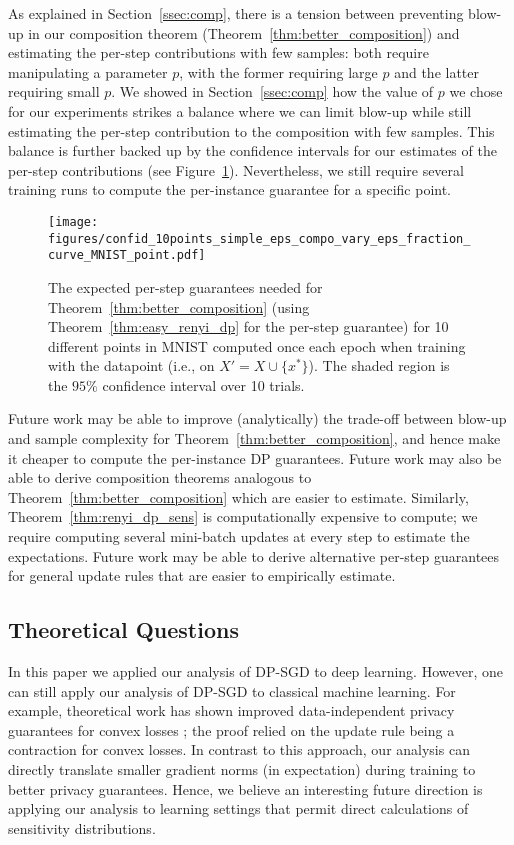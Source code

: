 As explained in Section~\ref{ssec:comp}, there is a tension between preventing blow-up in our composition theorem (Theorem~\ref{thm:better_composition}) and estimating the per-step contributions with few samples: both require manipulating a parameter $p$, with the former requiring large $p$ and the latter requiring small $p$. We showed in Section~\ref{ssec:comp} how the value of $p$ we chose for our experiments strikes a balance where we can limit blow-up while still estimating the per-step contribution to the composition with few samples. This balance is further backed up by the confidence intervals for our estimates of the per-step contributions (see Figure~\ref{fig:confid_10points}). Nevertheless, we still require several training runs to compute the per-instance guarantee for a specific point.

\begin{figure}
    \centering
    \texttt{[image: figures/confid\_10points\_simple\_eps\_compo\_vary\_eps\_fraction\_curve\_MNIST\_point.pdf]}
    \caption{The expected per-step guarantees needed for Theorem~\ref{thm:better_composition} (using Theorem~\ref{thm:easy_renyi_dp} for the per-step guarantee) for 10 different points in MNIST computed once each epoch when training with the datapoint (i.e., on $X' = X \cup \{x^*\}$). The shaded region is the $95\%$ confidence interval over 10 trials.}
    \label{fig:confid_10points}
\end{figure}

Future work may be able to improve (analytically) the trade-off between blow-up and sample complexity for Theorem~\ref{thm:better_composition}, and hence make it cheaper to compute the per-instance DP guarantees. Future work may also be able to derive composition theorems analogous to Theorem~\ref{thm:better_composition} which are easier to estimate. Similarly, Theorem~\ref{thm:renyi_dp_sens} is computationally expensive to compute; we require computing several mini-batch updates at every step to estimate the expectations. Future work may be able to derive alternative per-step guarantees for general update rules that are easier to empirically estimate.


\subsection{Theoretical Questions}
\label{ssec:theoretical_questions}

In this paper we applied our analysis of DP-SGD to deep learning. However, one can still apply our analysis of DP-SGD to classical machine learning. For example, theoretical work has shown improved data-independent privacy guarantees for convex losses \cite{altschuler2022privacy}; the proof relied on the update rule being a contraction for convex losses. In contrast to this approach, our analysis can directly translate smaller gradient norms (in expectation) during training to better privacy guarantees. Hence, we believe an interesting future direction is applying our analysis to learning settings that permit direct calculations of sensitivity distributions.

